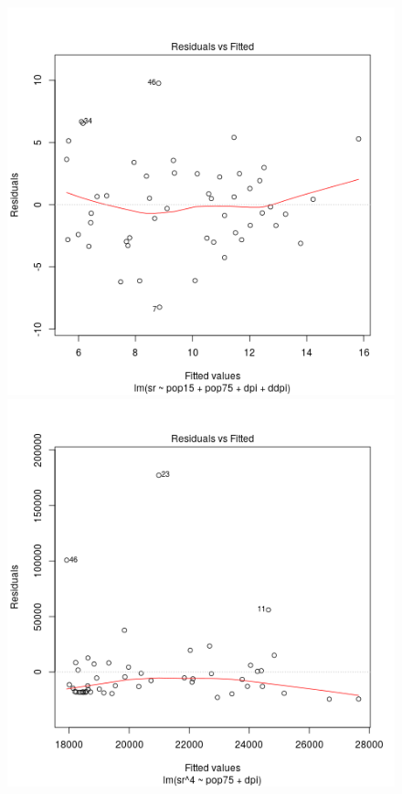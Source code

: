 \begin{figure}[p]
  \begin{center}
    \includegraphics[scale=0.48]{imgR/plot11.png} \hspace*{2cm} 
	\includegraphics[scale=0.48]{imgR/plot21.png} \\

\end{center}
\end{figure}
